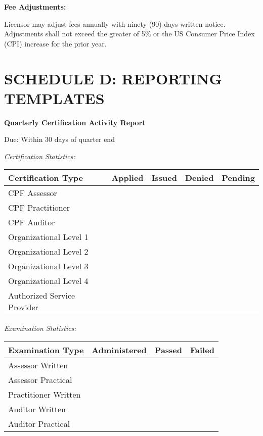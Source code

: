 \documentclass[11pt,a4paper]{article}
\begin{document}
\textbf{Fee Adjustments:}

Licensor may adjust fees annually with ninety (90) days written notice. Adjustments shall not exceed the greater of 5\% or the US Consumer Price Index (CPI) increase for the prior year.

\newpage

\section*{SCHEDULE D: REPORTING TEMPLATES}

\textbf{Quarterly Certification Activity Report}

Due: Within 30 days of quarter end

\vspace{1em}

\textit{Certification Statistics:}

\begin{tabular}{|l|c|c|c|c|}
\hline
\textbf{Certification Type} & \textbf{Applied} & \textbf{Issued} & \textbf{Denied} & \textbf{Pending} \\
\hline
CPF Assessor & & & & \\
CPF Practitioner & & & & \\
CPF Auditor & & & & \\
Organizational Level 1 & & & & \\
Organizational Level 2 & & & & \\
Organizational Level 3 & & & & \\
Organizational Level 4 & & & & \\
Authorized Service Provider & & & & \\
\hline
\end{tabular}

\vspace{1em}

\textit{Examination Statistics:}

\begin{tabular}{|l|c|c|c|}
\hline
\textbf{Examination Type} & \textbf{Administered} & \textbf{Passed} & \textbf{Failed} \\
\hline
Assessor Written & & & \\
Assessor Practical & & & \\
Practitioner Written & & & \\
Auditor Written & & & \\
Auditor Practical & & & \\
\hline
\end{tabular}
\end{document}
